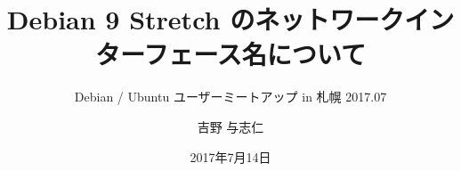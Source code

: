 




\documentclass[cjk,dvipdfmx,12pt]{beamer}
\usepackage{monthlypresentation}



\title{Debian 9 Stretch のネットワークインターフェース名について}
\subtitle{Debian / Ubuntu ユーザーミートアップ in 札幌 2017.07}
\author{吉野 与志仁}
\date{2017年7月14日}



